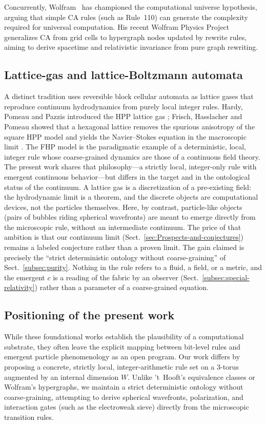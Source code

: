 \documentclass{ijuc}
\begin{document}
Concurrently, Wolfram~\cite{wolfram,wolfram2020physics} has championed the computational universe hypothesis, arguing that simple CA rules (such as Rule~110) can generate the complexity required for universal computation. His recent Wolfram Physics Project generalizes CA from grid cells to hypergraph nodes updated by rewrite rules, aiming to derive spacetime and relativistic invariance from pure graph rewriting. 

\subsection*{Lattice-gas and lattice-Boltzmann automata}
A distinct tradition uses reversible block cellular automata as lattice gases that reproduce continuum hydrodynamics from purely local integer rules.  Hardy, Pomeau and Pazzis introduced the HPP lattice gas \cite{hardy1976}; Frisch, Hasslacher and Pomeau showed that a hexagonal lattice removes the spurious anisotropy of the square HPP model and yields the Navier--Stokes equation in the macroscopic limit \cite{frisch1986}.  The FHP model is the paradigmatic example of a deterministic, local, integer rule whose coarse-grained dynamics are those of a continuous field theory.  The present work shares that philosophy---a strictly local, integer-only rule with emergent continuous behavior---but differs in the target and in the ontological status of the continuum.  A lattice gas is a discretization of a pre-existing field: the hydrodynamic limit is a theorem, and the discrete objects are computational devices, not the particles themselves.  Here, by contrast, particle-like objects (pairs of bubbles riding spherical wavefronts) are meant to emerge directly from the microscopic rule, without an intermediate continuum.  The price of that ambition is that our continuum limit (Sect.~\ref{sec:Prospects-and-conjectures}) remains a labeled conjecture rather than a proven limit.  The gain claimed is precisely the ``strict deterministic ontology without coarse-graining'' of Sect.~\ref{subsec:purity}.  Nothing in the rule refers to a fluid, a field, or a metric, and the emergent $c$ is a reading of the fabric by an observer (Sect.~\ref{subsec:special-relativity}) rather than a parameter of a coarse-grained equation.

\subsection*{Positioning of the present work}
While these foundational works establish the plausibility of a computational substrate, they often leave the explicit mapping between bit-level rules and emergent particle phenomenology as an open program. Our work differs by proposing a concrete, strictly local, integer-arithmetic rule set on a 3-torus augmented by an internal dimension $W$. Unlike 't~Hooft's equivalence classes or Wolfram's hypergraphs, we maintain a strict deterministic ontology without coarse-graining, attempting to derive spherical wavefronts, polarization, and interaction gates (such as the electroweak sieve) directly from the microscopic transition rules.
\end{document}
